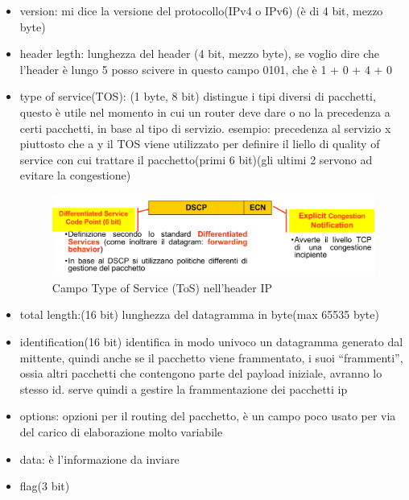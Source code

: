 \begin{itemize}
    \item version: mi dice la versione del protocollo(IPv4 o IPv6) (è di 4 bit, mezzo byte)
    \item header legth: lunghezza del header (4 bit, mezzo byte), se voglio dire che l'header è lungo 5 posso scivere in questo campo 0101, che è 1 + 0 + 4 + 0
    \item type of service(TOS): (1 byte, 8 bit) distingue i tipi diversi di pacchetti, questo è utile nel momento in cui un router deve dare o no la precedenza a certi pacchetti, in base al tipo di servizio. esempio: precedenza al servizio x piuttosto che a y
    il TOS viene utilizzato per definire il liello di quality of service con cui trattare il pacchetto(primi 6 bit)(gli ultimi 2 servono ad evitare la congestione)
    
    \begin{figure}[h!]
        \centering
        \includegraphics[width=1\textwidth]{images/tos.png}
        \caption{Campo Type of Service (ToS) nell'header IP}
        \label{fig:tos}
    \end{figure}

    \item total length:(16 bit) lunghezza del datagramma in byte(max 65535 byte)
    \item identification(16 bit) identifica in modo univoco un datagramma generato dal mittente, quindi anche se il pacchetto viene frammentato, i suoi “frammenti”, ossia altri pacchetti che contengono parte del payload iniziale, avranno lo stesso id. serve quindi a gestire la frammentazione dei pacchetti ip
    \item options: opzioni per il routing del pacchetto, è un campo poco usato per via del carico di elaborazione molto variabile
    \item data: è l'informazione da inviare
\end{itemize}
\newpage
\begin{itemize}
    \item flag(3 bit)
\end{itemize}
